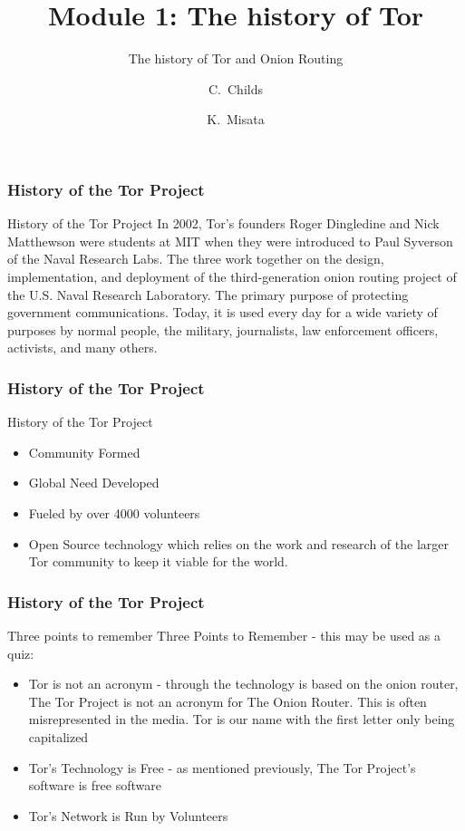 \documentclass{beamer}
\title[Module 1: The history of Tor]
{Module 1: The history of Tor}
\subtitle{The history of Tor and Onion Routing}
\author[]
{C.~Childs\inst{1} \and K.~Misata\inst{2}}
\institute[The Tor Project]
{
  \inst{1}
  Support coordinator / Translation coordinator\\
  The Tor Project
  \and
  \inst{2}
  Outreach coordinator\\
  The Tor Project
}
\begin{document}
\frame{\titlepage}

\begin{frame}
\frametitle{History of the Tor Project}
	\begin{block}{History of the Tor Project}
          In 2002, Tor's founders Roger Dingledine and Nick Matthewson were students at MIT when they were introduced to Paul Syverson of the Naval Research Labs. The three work together on the design, implementation, and deployment of the third-generation onion routing project of the U.S. Naval Research Laboratory. The primary purpose of protecting government communications. Today, it is used every day for a wide variety of purposes by normal people, the military, journalists, law enforcement officers, activists, and many others.
	\end{block}
\end{frame}

\begin{frame}
\frametitle{History of the Tor Project}
	\begin{block}{History of the Tor Project}
		\begin{itemize}
			\item<1-> Community Formed
			\item<2-> Global Need Developed
			\item<3-> Fueled by over 4000 volunteers
			\item<4-> Open Source technology which relies on the work and research of the larger Tor community to keep it viable for the world.
		\end{itemize}
	\end{block}
\end{frame}

\begin{frame}
\frametitle{History of the Tor Project}
	\begin{block}{Three points to remember}
          Three Points to Remember - this may be used as a quiz: \pause
		\begin{itemize}
			\item<1-> Tor is not an acronym - through the technology is based on the onion router, The Tor Project is not an acronym for The Onion Router. This is often misrepresented in the media. Tor is our name with the first letter only being capitalized \pause
			\item<2-> Tor's Technology is Free - as mentioned previously, The Tor Project's software is free software \pause
			\item<3-> Tor's Network is Run by Volunteers
		\end{itemize}
	\end{block}
\end{frame}
\end{document}

